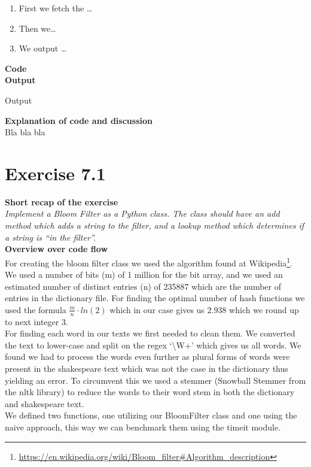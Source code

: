 \documentclass{article}
\newcommand\pythonstyle{\lstset{
language=python,
breaklines=true,
basicstyle=\ttfamily\small,
otherkeywords={1, 2, 3, 4, 5, 6, 7, 8 ,9 , 0, -, =, +, [, ], (, \), \{, \}, :, *, !},             %
keywordstyle=\color{blue},
emph={class, pass, in, for, while, if, is, elif, else, not, and, or, OR
    def, print, exec, break, continue, return},
emphstyle=\color{black}\bfseries,
emph={[2]True, False, None, self},
emphstyle=[2]\color{purple},
emph={[3]from, import, as},
emphstyle=[3]\color{blue},
stringstyle=\color{red},
frame=tb,
showstringspaces=false,
morecomment=[s]{"""}{"""},
commentstyle=\color{gray},
rulesepcolor=\color{blue},
title=\lstname
}}
\newcommand\pythonexternal[2][]{{
\pythonstyle
}}
\begin{document}
\begin{enumerate}
  \item First we fetch the \ldots
  \item Then we\ldots
  \item We output \ldots\\
\end{enumerate}

\textbf{Code}\\
\textbf{Output}
\begin{pythonOutput}
Output
\end{pythonOutput}
\textbf{Explanation of code and discussion}\\
Bla bla bla


\section{Exercise 7.1}
\textbf{Short recap of the exercise}\\
\textit{Implement a Bloom Filter as a Python class. The class should have an add method which adds a string to the filter, and a lookup method which determines if a string is “in the filter”.}\\

\textbf{Overview over code flow}\\
For creating the bloom filter class we used the algorithm found at Wikipedia\footnote{\url{https://en.wikipedia.org/wiki/Bloom_filter#Algorithm_description}}.\\
We used a number of bits (m) of 1 million for the bit array, and we used an estimated number of distinct entries (n) of 235887 which are the number of entries in the dictionary file.
For finding the optimal number of hash functions we used the formula $\frac{m}{n} \cdot ln(2)$ which in our case gives us $2.938$ which we round up to next integer $3$.\\
For finding each word in our texts we first needed to clean them. We converted the text to lower-case and split on the regex `\textbackslash W+' which gives us all words. We found we had to process the words even further as plural forms of words were present in the shakespeare text which was not the case in the dictionary thus yielding an error. To circumvent this we used a stemmer (Snowball Stemmer from the nltk library) to reduce the words to their word stem in both the dictionary and shakespeare text.\\
We defined two functions, one utilizing our BloomFilter class and one using the naive approach, this way we can benchmark them using the timeit module.\\
\end{document}
